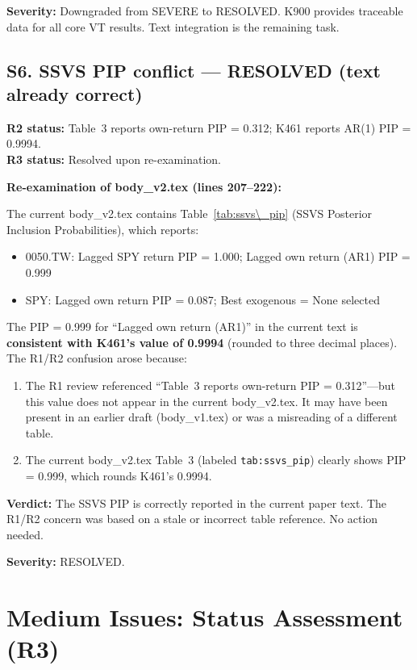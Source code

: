 \documentclass[12pt,a4paper]{article}
\begin{document}
\textbf{Severity:} \textcolor{okgreen}{Downgraded from SEVERE to RESOLVED.} K900 provides traceable data for all core VT results. Text integration is the remaining task.

\bigskip

\subsection*{\textcolor{okgreen}{S6. SSVS PIP conflict --- RESOLVED (text already correct)}}

\textbf{R2 status:} Table~3 reports own-return PIP = 0.312; K461 reports AR(1) PIP = 0.9994.\\
\textbf{R3 status:} \textcolor{okgreen}{Resolved upon re-examination.}

\medskip
\noindent\textbf{Re-examination of body\_v2.tex (lines 207--222):}

The current body\_v2.tex contains Table~\ref{tab:ssvs\_pip} (SSVS Posterior Inclusion Probabilities), which reports:
\begin{itemize}[nosep]
\item 0050.TW: Lagged SPY return PIP = 1.000; Lagged own return (AR1) PIP = 0.999
\item SPY: Lagged own return PIP = 0.087; Best exogenous = None selected
\end{itemize}

The PIP = 0.999 for ``Lagged own return (AR1)'' in the current text is \textbf{consistent with K461's value of 0.9994} (rounded to three decimal places). The R1/R2 confusion arose because:
\begin{enumerate}[nosep]
\item The R1 review referenced ``Table~3 reports own-return PIP = 0.312''---but this value does not appear in the current body\_v2.tex. It may have been present in an earlier draft (body\_v1.tex) or was a misreading of a different table.
\item The current body\_v2.tex Table~3 (labeled \texttt{tab:ssvs\_pip}) clearly shows PIP = 0.999, which rounds K461's 0.9994.
\end{enumerate}

\textbf{Verdict:} The SSVS PIP is correctly reported in the current paper text. The R1/R2 concern was based on a stale or incorrect table reference. No action needed.

\textbf{Severity:} \textcolor{okgreen}{RESOLVED.}


\section*{Medium Issues: Status Assessment (R3)}
\end{document}
